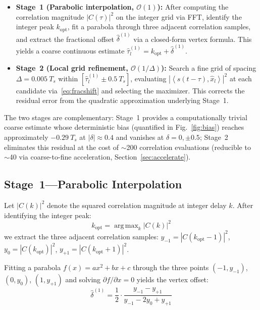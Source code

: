 \documentclass[a4paper,fleqn]{cas-dc}
\DeclareMathOperator*{\argmax}{arg\,max}
\newcommand{\bigO}{\mathcal{O}}
\newcommand{\inner}[2]{\left\langle #1, #2 \right\rangle}
\newcommand{\hb}[1]{\hat{#1}}
\begin{document}
\begin{itemize}
\item \textbf{Stage~1 (Parabolic interpolation, $\bigO(1)$):} After computing the correlation magnitude $|C(\tau)|^2$ on the integer grid via FFT, identify the integer peak $k_{\text{opt}}$, fit a parabola through three adjacent correlation samples, and extract the fractional offset $\hat{\delta}^{(1)}$ via a closed-form vertex formula. This yields a coarse continuous estimate $\hat{\tau}^{(1)}_l = k_{\text{opt}} + \hat{\delta}^{(1)}$.

\item \textbf{Stage~2 (Local grid refinement, $\bigO(1/\Delta)$):} Search a fine grid of spacing $\Delta = 0.005\ T_s$ within $[\hat{\tau}^{(1)}_l \pm 0.5\ T_s]$, evaluating $|\inner{s(t-\tau)}{\hb{x}_l}|^2$ at each candidate via~\eqref{eq:fracshift} and selecting the maximizer. This corrects the residual error from the quadratic approximation underlying Stage~1.
\end{itemize}

The two stages are complementary: Stage~1 provides a computationally trivial coarse estimate whose deterministic bias (quantified in Fig.~\ref{fig:bias}) reaches approximately $-0.29\ T_s$ at $|\delta|\approx0.4$ and vanishes at $\delta=0,\pm0.5$; Stage~2 eliminates this residual at the cost of $\sim$200 correlation evaluations (reducible to $\sim$40 via coarse-to-fine acceleration, Section~\ref{sec:accelerate}).

\subsection{Stage~1---Parabolic Interpolation}

Let $|C(k)|^2$ denote the squared correlation magnitude at integer delay $k$. After identifying the integer peak:
\begin{equation}
k_{\text{opt}} = \argmax_k |C(k)|^2
\label{eq:kopt}
\end{equation}
we extract the three adjacent correlation samples: $y_{-1} = |C(k_{\text{opt}}-1)|^2$, $y_0 = |C(k_{\text{opt}})|^2$, $y_{+1} = |C(k_{\text{opt}}+1)|^2$.

Fitting a parabola $f(x) = ax^2 + bx + c$ through the three points $(-1, y_{-1})$, $(0, y_0)$, $(1, y_{+1})$ and solving $\partial f/\partial x = 0$ yields the vertex offset:
\begin{equation}
\hat{\delta}^{(1)} = \frac{1}{2} \cdot \frac{y_{-1} - y_{+1}}{y_{-1} - 2y_0 + y_{+1}}
\label{eq:delta1}
\end{equation}
\end{document}
